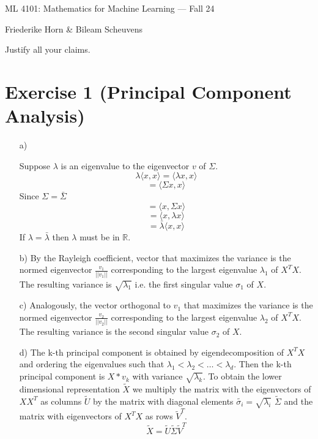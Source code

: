 \documentclass[10pt]{article}
\numberwithin{equation}{section}
\begin{document}
\begin{center}
    \sc ML 4101: Mathematics for Machine Learning --- Fall 24
\end{center}

\noindent Friederike Horn \& Bileam Scheuvens

Justify all your claims.
\section*{Exercise 1 (Principal Component Analysis)}
\begin{enumerate}
\item[a)]{
Suppose $\lambda$ is an eigenvalue to the eigenvector $v$ of $\Sigma$.
$$\lambda \langle x, x\rangle = \langle \lambda x, x\rangle $$
$$=  \langle \Sigma x, x\rangle $$
Since $\Sigma = \bar{\Sigma}$
$$=  \langle  x, \Sigma x\rangle $$
$$=  \langle  x, \lambda x\rangle $$
$$= \bar{\lambda} \langle  x,  x\rangle $$
If $\lambda = \bar{\lambda}$ then $\lambda$ must be in $\mathbb{R}$.

  }
\item[b)]{
    By the Rayleigh coefficient, vector that maximizes the variance is the normed eigenvector $\frac{v_1}{||v_1||}$ corresponding to the largest eigenvalue $\lambda_1$ of $X^TX$. The resulting variance is $\sqrt{\lambda_1}$ i.e. the first singular value $\sigma_1$ of $X$.
  }
\item[c)]{
    Analogously, the vector orthogonal to $v_1$ that maximizes the variance is the normed eigenvector $\frac{v_2}{||v_2||}$ corresponding to the largest eigenvalue $\lambda_2$ of $X^TX$. The resulting variance is the second singular value $\sigma_2$ of $X$.
  }
\item[d)]{
  The k-th principal component is obtained by eigendecomposition of $X^TX$ and ordering the eigenvalues such that $\lambda_1 < \lambda_2 < \dots < \lambda_d$. Then the k-th principal component is $X*v_k$ with variance $\sqrt{\lambda_k}$.
  To obtain the lower dimensional representation $\tilde{X}$ we multiply the matrix with the eigenvectors of $XX^T$ as columns $\tilde{U}$ by the matrix with diagonal elements $\tilde{\sigma_i} = \sqrt{\lambda_i}$ $\tilde{\Sigma}$ and the matrix with eigenvectors of $X^TX$ as rows $\tilde{V}^T$.
  $$\tilde{X} = \tilde{U}\tilde{\Sigma}\tilde{V}^T$$
  }
\end{enumerate}
\end{document}
